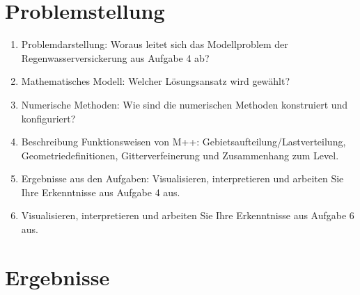 \documentclass[12pt,a4paper]{scrartcl}
\numberwithin{equation}{section}
\begin{document}



\section{Problemstellung}

\begin{enumerate}[label=(\roman*)]
\item Problemdarstellung: Woraus leitet sich das Modellproblem der Regenwasserversickerung aus Aufgabe 4 ab?
\item Mathematisches Modell: Welcher Lösungsansatz wird gewählt?
\item Numerische Methoden: Wie sind die numerischen Methoden konstruiert und konfiguriert?
\item Beschreibung  Funktionsweisen  von M++:  Gebietsaufteilung/Lastverteilung,  Geometriedefinitionen, Gitterverfeinerung und Zusammenhang zum Level.
\item Ergebnisse aus den Aufgaben: Visualisieren, interpretieren und arbeiten Sie Ihre Erkenntnisse aus Aufgabe 4 aus.
\item Visualisieren, interpretieren und arbeiten Sie Ihre Erkenntnisse aus Aufgabe 6 aus.
\end{enumerate}

\section{Ergebnisse}
\end{document}
